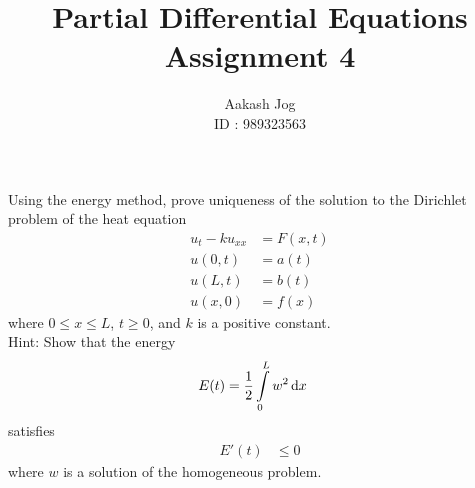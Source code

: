 \documentclass[fleqn, a4paper, 11pt, oneside]{amsart}
\title
[
	PDE : Assignment 4
]
{
	Partial Differential Equations\\
	Assignment 4
}
\author
{
	Aakash Jog\\
	ID : 989323563
}
\date{\formatdate{31}{3}{2016}}
\theoremstyle{definition}
\theoremstyle{theorem}
\begin{document}
\maketitle

\begin{question}
	Using the energy method, prove uniqueness of the solution to the Dirichlet problem of the heat equation
	\begin{align*}
		u_t - k u_{x x} &= F(x,t)\\
		u(0,t) &= a(t)\\
		u(L,t) &= b(t)\\
		u(x,0) &= f(x)
	\end{align*}
	where $0 \le x \le L$, $t \ge 0$, and $k$ is a positive constant.\\
	Hint: Show that the energy
	\begin{align*}
		E(t) &= \frac{1}{2} \int\limits_{0}^{L} w^2 \dif x
	\end{align*}
	satisfies
	\begin{align*}
		E'(t) &\le 0
	\end{align*}
	where $w$ is a solution of the homogeneous problem.
\end{question}
\end{document}
